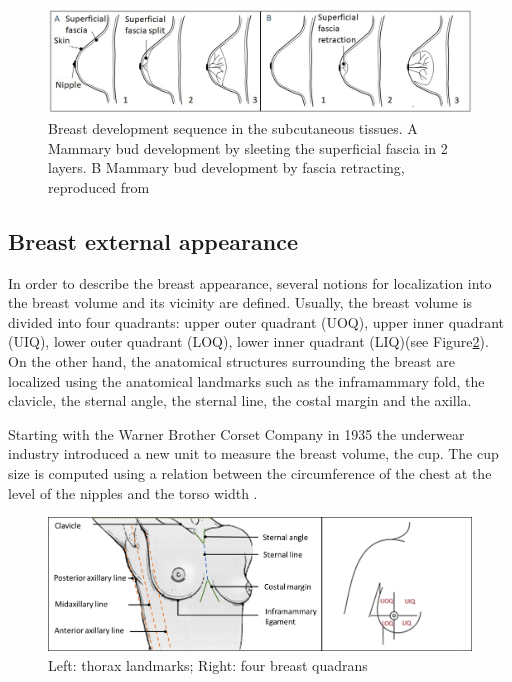 \begin{figure}[!h]
\centering
\includegraphics[width=0.9\linewidth,keepaspectratio]{figures/breastEvol_fascia_my.jpg} 
\caption[Breast development sequence into subcutaneous tissues. A Mammary bud development by splitting the superficial fascia in 2 layers. B Mammary bud development by superficial fascia retracting]{Breast development sequence in the subcutaneous tissues. A Mammary bud development by sleeting the superficial fascia in 2 layers. B Mammary bud development by fascia retracting, reproduced from  \citep{kopans2007breast}  }
\label{breastevol_fascia}
\end{figure}


\subsection{Breast external appearance}\label{subsection:breastappearance}

In order to describe the breast appearance, several notions for localization into the breast volume and its vicinity are defined. Usually, the breast volume is divided into four quadrants: upper outer quadrant (UOQ), upper inner quadrant (UIQ), lower outer quadrant (LOQ), lower inner quadrant (LIQ)(see Figure\ref{fig:Breast_quadrants_full}). On the other hand, the anatomical structures surrounding the breast are localized using the anatomical landmarks such as  the inframammary fold, the clavicle, the sternal angle, the sternal line, the costal margin and the axilla.

Starting with the Warner Brother Corset Company in 1935 the underwear industry introduced a new unit to measure the breast volume, the cup. The cup size is computed using a relation between the circumference of the chest at the level of the nipples and the torso width \citep{pechter_new_1998}.

\begin{figure}[h]
\centering
 \includegraphics[width=\textwidth,keepaspectratio]{figures/Breast_quadrants_full.png}
  \caption{Left: thorax landmarks; Right: four breast quadrans \citep{vandeput2002considerations}}\label{fig:Breast_quadrants_full}
\end{figure}


